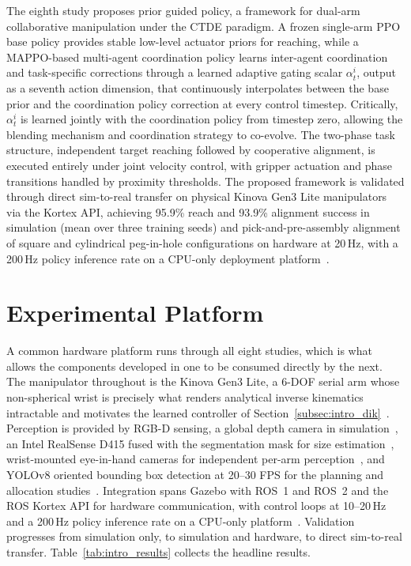 The eighth study proposes prior guided policy, a framework for dual-arm collaborative manipulation under the CTDE paradigm. A frozen single-arm PPO base policy provides stable
low-level actuator priors for reaching, while a MAPPO-based multi-agent coordination policy learns
inter-agent coordination and task-specific corrections through a learned adaptive gating scalar
$\alpha_{t}^{i}$, output as a seventh action dimension, that continuously interpolates between the
base prior and the coordination policy correction at every control timestep. Critically,
$\alpha_{t}^{i}$ is learned jointly with the coordination policy from timestep zero, allowing the
blending mechanism and coordination strategy to co-evolve. The two-phase task structure,
independent target reaching followed by cooperative alignment, is executed entirely under joint
velocity control, with gripper actuation and phase transitions handled by proximity thresholds. The
proposed framework is validated through direct sim-to-real transfer on physical Kinova Gen3 Lite
manipulators via the Kortex API, achieving 95.9\% reach and 93.9\% alignment success in simulation
(mean over three training seeds) and pick-and-pre-assembly alignment of square and cylindrical peg-in-hole configurations on hardware
at 20\,Hz, with a 200\,Hz policy inference rate on a CPU-only deployment
platform~\citep{sk2026priorguided}.

\section{Experimental Platform}\label{sec:intro_platform}

A common hardware platform runs through all eight studies, which is what allows the components
developed in one to be consumed directly by the next. The manipulator throughout is the Kinova Gen3
Lite, a 6-DOF serial arm whose non-spherical wrist is precisely what renders analytical inverse
kinematics intractable and motivates the learned controller of
Section~\ref{subsec:intro_dik}~\citep{sk2025diktracking}. Perception is provided by RGB-D sensing,
a global depth camera in simulation~\citep{sk2024bolthandling}, an Intel RealSense D415 fused with
the segmentation mask for size estimation~\citep{sk2024boltsorting}, wrist-mounted eye-in-hand
cameras for independent per-arm perception~\citep{sk2025sharedvision}, and YOLOv8 oriented bounding
box detection at 20--30 FPS for the planning and allocation
studies~\citep{surya2025iapf,sk2025competitive}. Integration spans Gazebo with ROS~1 and ROS~2 and the
ROS Kortex API for hardware communication, with control loops at 10--20\,Hz and a 200\,Hz policy
inference rate on a CPU-only platform~\citep{sk2025competitive,sk2026priorguided}. Validation progresses
from simulation only, to simulation and hardware, to direct sim-to-real transfer.
Table~\ref{tab:intro_results} collects the headline results.

